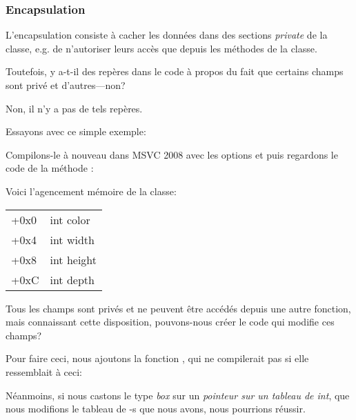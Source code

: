 \subsubsection{Encapsulation}

L'encapsulation consiste à cacher les données dans des sections \emph{private} de la
classe, e.g. de n'autoriser leurs accès que depuis les méthodes de la classe.

Toutefois, y a-t-il des repères dans le code à propos du fait que certains champs
sont privé et d'autres---non?

Non, il n'y a pas de tels repères.

Essayons avec ce simple exemple:



Compilons-le à nouveau dans MSVC 2008 avec les options \Ox et \Obzero puis regardons
le code de la méthode :



Voici l'agencement mémoire de la classe:

\begin{center}
\begin{tabular}{ | l | l | }
\hline
  \tableheader{} \\
\hline
  +0x0 & int color \\
\hline
  +0x4 & int width \\
\hline
  +0x8 & int height \\
\hline
  +0xC & int depth \\
\hline
\end{tabular}
\end{center}

Tous les champs sont privés et ne peuvent être accédés depuis une autre fonction,
mais connaissant cette disposition, pouvons-nous créer le code qui modifie ces champs?

Pour faire ceci, nous ajoutons la fonction , qui ne
compilerait pas si elle ressemblait à ceci:



Néanmoins, si nous castons le type \emph{box} sur un \emph{pointeur sur un tableau de int},
que nous modifions le tableau de \Tint{}-s que nous avons, nous pourrions réussir.



